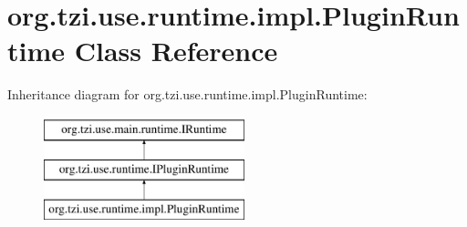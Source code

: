 \hypertarget{classorg_1_1tzi_1_1use_1_1runtime_1_1impl_1_1_plugin_runtime}{\section{org.\-tzi.\-use.\-runtime.\-impl.\-Plugin\-Runtime Class Reference}
\label{classorg_1_1tzi_1_1use_1_1runtime_1_1impl_1_1_plugin_runtime}
}
Inheritance diagram for org.\-tzi.\-use.\-runtime.\-impl.\-Plugin\-Runtime\-:\begin{figure}[H]
\begin{center}
\leavevmode
\includegraphics[height=3.000000cm]{classorg_1_1tzi_1_1use_1_1runtime_1_1impl_1_1_plugin_runtime}
\end{center}
\end{figure}
